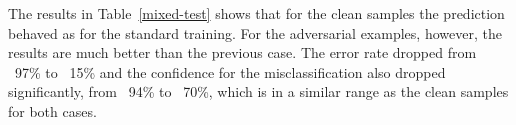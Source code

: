 The results in Table~\ref{mixed-test} shows that for the clean samples the prediction behaved as for the standard training. For the adversarial examples, however, the results are much better than the previous case. The error rate dropped from ~97\% to ~15\% and the confidence for the misclassification also dropped significantly, from ~94\% to ~70\%, which is in a similar range as the clean samples for both cases.
